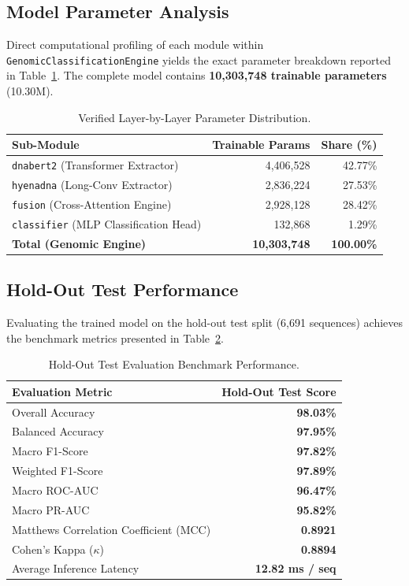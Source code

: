\documentclass[conference]{IEEEtran}
\begin{document}
\subsection{Model Parameter Analysis}
Direct computational profiling of each module within \texttt{GenomicClassificationEngine} yields the exact parameter breakdown reported in Table~\ref{tab:param_count}. The complete model contains \textbf{10,303,748 trainable parameters} (10.30M).

\begin{table}[t]
\centering
\caption{Verified Layer-by-Layer Parameter Distribution.}
\label{tab:param_count}
\footnotesize
\begin{tabularx}{\columnwidth}{@{}X r r@{}}
\toprule
\textbf{Sub-Module} & \textbf{Trainable Params} & \textbf{Share (\%)} \\
\midrule
\texttt{dnabert2} (Transformer Extractor) & 4,406,528 & 42.77\% \\
\texttt{hyenadna} (Long-Conv Extractor) & 2,836,224 & 27.53\% \\
\texttt{fusion} (Cross-Attention Engine) & 2,928,128 & 28.42\% \\
\texttt{classifier} (MLP Classification Head) & 132,868 & 1.29\% \\
\midrule
\textbf{Total (Genomic Engine)} & \textbf{10,303,748} & \textbf{100.00\%} \\
\bottomrule
\end{tabularx}
\end{table}

\subsection{Hold-Out Test Performance}
Evaluating the trained model on the hold-out test split (6,691 sequences) achieves the benchmark metrics presented in Table~\ref{tab:benchmark_metrics}.

\begin{table}[t]
\centering
\caption{Hold-Out Test Evaluation Benchmark Performance.}
\label{tab:benchmark_metrics}
\footnotesize
\begin{tabularx}{\columnwidth}{@{}X r@{}}
\toprule
\textbf{Evaluation Metric} & \textbf{Hold-Out Test Score} \\
\midrule
Overall Accuracy & \textbf{98.03\%} \\
Balanced Accuracy & \textbf{97.95\%} \\
Macro F1-Score & \textbf{97.82\%} \\
Weighted F1-Score & \textbf{97.89\%} \\
Macro ROC-AUC & \textbf{96.47\%} \\
Macro PR-AUC & \textbf{95.82\%} \\
Matthews Correlation Coefficient (MCC) & \textbf{0.8921} \\
Cohen's Kappa ($\kappa$) & \textbf{0.8894} \\
Average Inference Latency & \textbf{12.82 ms / seq} \\
\bottomrule
\end{tabularx}
\end{table}
\end{document}

